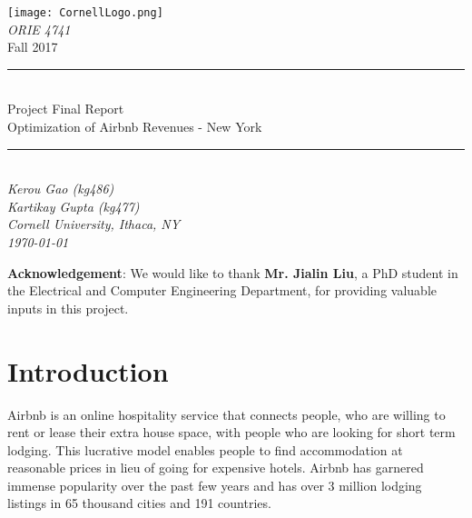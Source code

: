 \documentclass[12pt]{article}
\begin{document}
\rmfamily %

\begin{titlepage}
\begin{center}
\texttt{[image: CornellLogo.png]}\\[0.2cm]
\textsl{\LARGE ORIE 4741 }\\[0.5cm]
{\huge Fall 2017}\\[0.2cm]
\centering
\rule{\linewidth}{0.5mm}\\[0.4cm]
{\LARGE Project Final Report \\[0.4cm] Optimization of Airbnb Revenues - New York}
\rule{\linewidth}{0.5mm}\\[0.4cm]
\textsl{\Large  Kerou Gao (kg486)\\Kartikay Gupta (kg477)\\}
\vspace{5mm}
\textsl{\Large Cornell University, Ithaca, NY}\\[0.2cm]

\textsl{\Large{\today}}\\[9cm]

\end{center}

\noindent \textbf{Acknowledgement}: We would like to thank \textbf{Mr. Jialin Liu}, a PhD student in the Electrical and Computer Engineering Department, for providing valuable inputs in this project.

\end{titlepage}

\pagestyle{fancy}
\fancyhf{}
\setlength{\headheight}{50pt}
\renewcommand{\headrulewidth}{0.4pt}
\renewcommand{\footrulewidth}{0.4pt}
\cfoot{\thepage}



\section*{Introduction}
\noindent Airbnb is an online hospitality service that connects people, who are willing to rent or lease their extra house space, with people who are looking for short term lodging. This lucrative model enables people to find accommodation at reasonable prices in lieu of going for expensive hotels. Airbnb has garnered immense popularity over the past few years and has over 3 million lodging listings in 65 thousand cities and 191 countries. 
\end{document}
